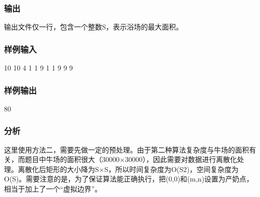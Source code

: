 \subsubsection{输出}
输出文件仅一行，包含一个整数S，表示浴场的最大面积。

\subsubsection{样例输入}
\begin{Code}
10 10
4
1 1
9 1
1 9
9 9
\end{Code}

\subsubsection{样例输出}
\begin{Code}
80
\end{Code}

\subsubsection{分析}
这里使用方法二，需要先做一定的预处理。由于第二种算法复杂度与牛场的面积有关，而题目中牛场的面积很大（30000×30000），因此需要对数据进行离散化处理。离散化后矩形的大小降为S×S，所以时间复杂度为O(S2)，空间复杂度为O(S)。需要注意的是，为了保证算法能正确执行，把(0,0)和(m,n)设置为产奶点，相当于加上了一个“虚拟边界”。

